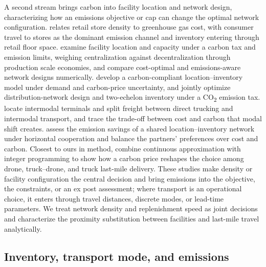 \documentclass[11pt]{article}
\numberwithin{proposition}{section}
\theoremstyle{definition}
\theoremstyle{remark}
\theoremstyle{plain}
\begin{document}
A second stream brings carbon into facility location and network design, characterizing how an emissions
objective or cap can change the optimal network configuration. \citet{cachon2014retail}
relates retail store density to greenhouse gas cost, with consumer travel to stores as the dominant emission
channel and inventory entering through retail floor space. \citet{turken2017facility} examine facility location
and capacity under a carbon tax and emission limits, weighing centralization against decentralization through
production scale economies, and \citet{harris2011assessing} compare cost-optimal and emissions-aware network
designs numerically. \citet{wang2020carbon} develop a carbon-compliant location--inventory model under demand and
carbon-price uncertainty, and \citet{li2017joint} jointly optimize distribution-network design and two-echelon
inventory under a CO\textsubscript{2} emission tax. \citet{bouchery2015cost} locate intermodal terminals and split
freight between direct trucking and intermodal transport, and trace the trade-off between cost and carbon that
modal shift creates. \citet{hacardiaux2020assessing, hacardiaux2022balancing} assess the emission savings of a
shared location--inventory network under horizontal cooperation and balance the partners' preferences over cost
and carbon. Closest to ours in method, \citet{zhang2026economic} combine continuous
approximation with integer programming to show how a carbon price reshapes the choice among drone,
truck--drone, and truck last-mile delivery.
These studies make density or facility configuration the central decision and bring emissions into the
objective, the constraints, or an ex post assessment; where transport is an operational choice, it enters through
travel distances, discrete modes, or lead-time parameters. We treat network density and replenishment speed as
joint decisions and characterize the proximity substitution between facilities and last-mile travel
analytically.

\subsection{Inventory, transport mode, and emissions}
\end{document}
